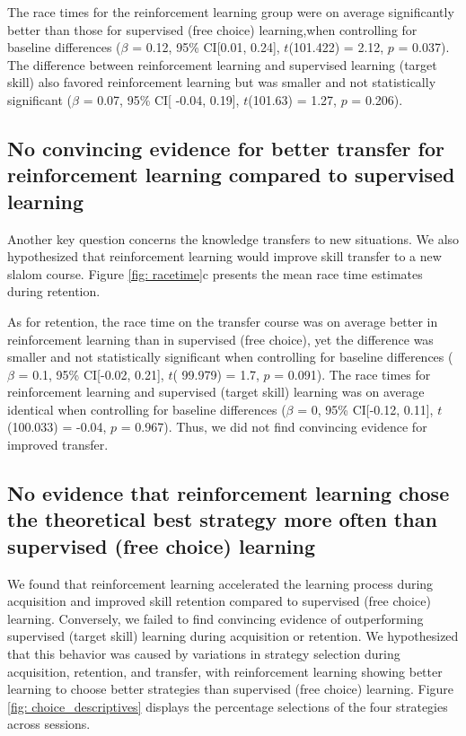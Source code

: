 \documentclass[pdflatex,sn-mathphys-num]{sn-jnl}%
\theoremstyle{thmstyleone}%
\theoremstyle{thmstyletwo}%
\theoremstyle{thmstylethree}%
\begin{document}
The race times for the reinforcement learning group were on average significantly better than those for supervised (free choice) learning,when controlling for baseline differences ($\beta$ = 0.12, 95\% CI[0.01, 0.24], $t$(101.422) = 2.12, $p$ = 0.037). The difference between reinforcement learning and supervised learning (target skill) also favored reinforcement learning but was smaller and not statistically significant ($\beta$ = 0.07, 95\% CI[ -0.04, 0.19], $t$(101.63) = 1.27, $p$ = 0.206). 

\subsection{No convincing evidence for better transfer for reinforcement learning compared to supervised learning} \label{result_racetime_transfer}
Another key question concerns the knowledge transfers to new situations. We also hypothesized that reinforcement learning would improve skill transfer to a new slalom course. Figure \ref{fig: racetime}c presents the mean race time estimates during retention.

As for retention, the race time on the transfer course was on average better in reinforcement learning than in supervised (free choice), yet the difference was smaller and not statistically significant when controlling for baseline differences ($\beta$ = 0.1, 95\% CI[-0.02, 0.21], $t$( 99.979) = 1.7, $p$  = 0.091). The race times for reinforcement learning and supervised (target skill) learning was on average identical when controlling for baseline differences ($\beta$ = 0, 95\% CI[-0.12, 0.11], $t$(100.033) = -0.04, $p$ = 0.967). Thus, we did not find convincing evidence for improved transfer.


\subsection{No evidence that reinforcement learning chose the theoretical best strategy more often than supervised (free choice) learning}\label{subsubsec3}
We found that reinforcement learning accelerated the learning process during acquisition and improved skill retention compared to supervised (free choice) learning. Conversely, we failed to find convincing evidence of outperforming supervised (target skill) learning during acquisition or retention. We hypothesized that this behavior was caused by variations in strategy selection during acquisition, retention, and transfer, with reinforcement learning showing better learning to choose better strategies than supervised (free choice) learning. Figure \ref{fig: choice_descriptives} displays the percentage selections of the four strategies across sessions.
\end{document}
